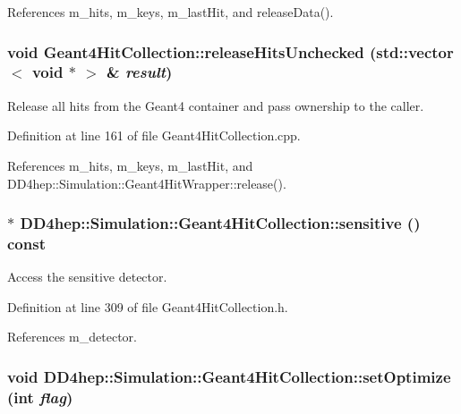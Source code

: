 References m\_\-hits, m\_\-keys, m\_\-lastHit, and releaseData().\hypertarget{class_d_d4hep_1_1_simulation_1_1_geant4_hit_collection_a38a222d3123281d7bb8f19f98027ec0b}{
\subsubsection[{releaseHitsUnchecked}]{\setlength{\rightskip}{0pt plus 5cm}void Geant4HitCollection::releaseHitsUnchecked (std::vector$<$ void $\ast$ $>$ \& {\em result})}}
\label{class_d_d4hep_1_1_simulation_1_1_geant4_hit_collection_a38a222d3123281d7bb8f19f98027ec0b}


Release all hits from the Geant4 container and pass ownership to the caller. 

Definition at line 161 of file Geant4HitCollection.cpp.

References m\_\-hits, m\_\-keys, m\_\-lastHit, and DD4hep::Simulation::Geant4HitWrapper::release().\hypertarget{class_d_d4hep_1_1_simulation_1_1_geant4_hit_collection_ad0913228818c6f091502597a00267725}{
\subsubsection[{sensitive}]{$\ast$ DD4hep::Simulation::Geant4HitCollection::sensitive () const}}
\label{class_d_d4hep_1_1_simulation_1_1_geant4_hit_collection_ad0913228818c6f091502597a00267725}


Access the sensitive detector. 

Definition at line 309 of file Geant4HitCollection.h.

References m\_\-detector.\hypertarget{class_d_d4hep_1_1_simulation_1_1_geant4_hit_collection_a163e9842ded780e1f39dbe6701c132d8}{
\subsubsection[{setOptimize}]{\setlength{\rightskip}{0pt plus 5cm}void DD4hep::Simulation::Geant4HitCollection::setOptimize (int {\em flag})}}
\label{class_d_d4hep_1_1_simulation_1_1_geant4_hit_collection_a163e9842ded780e1f39dbe6701c132d8}


